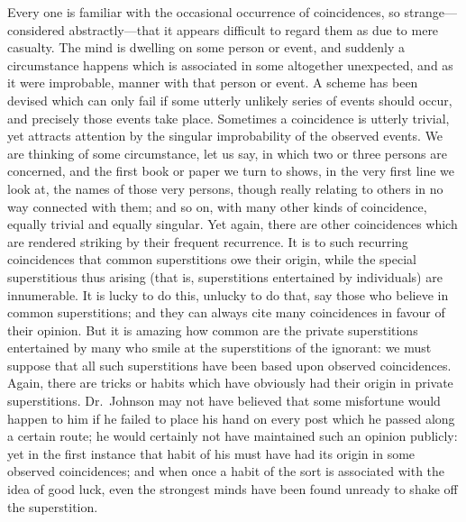 \documentclass[letterpaper,12pt,oneside,openany]{memoir}
\begin{document}
Every one is familiar with the occasional occurrence of
coincidences, so strange---considered abstractly---that it
appears difficult to regard them as due to mere casualty.
The mind is dwelling on some person or event, and
suddenly a circumstance happens which is associated
in some altogether unexpected, and as it were improbable,
manner with that person or event. A scheme
has been devised which can only fail if some utterly
unlikely series of events should occur, and precisely
those events take place. Sometimes a coincidence is
utterly trivial, yet attracts attention by the singular
improbability of the observed events. We are thinking
of some circumstance, let us say, in which two or three
persons are concerned, and the first book or paper we
turn to shows, in the very first line we look at, the
names of those very persons, though really relating to
others in no way connected with them; and so on, with
many other kinds of coincidence, equally trivial and
equally singular. Yet again, there are other coincidences
which are rendered striking by their frequent recurrence.
It is to such recurring coincidences that common superstitions
owe their origin, while the special superstitious
thus arising (that is, superstitions entertained by individuals)
are innumerable. It is lucky to do this,
unlucky to do that, say those who believe in common
superstitions; and they can always cite many coincidences
in favour of their opinion. But it is amazing
how common are the private superstitions entertained by
many who smile at the superstitions of the ignorant:
we must suppose that all such superstitions have been
based upon observed coincidences. Again, there are
tricks or habits which have obviously had their origin
in private superstitions. Dr.~Johnson may not have
believed that some misfortune would happen to him if
he failed to place his hand on every post which he passed
along a certain route; he would certainly not have
maintained such an opinion publicly: yet in the first
instance that habit of his must have had its origin in
some observed coincidences; and when once a habit of
the sort is associated with the idea of good luck, even
the strongest minds have been found unready to shake
off the superstition.%
%
\end{document}
